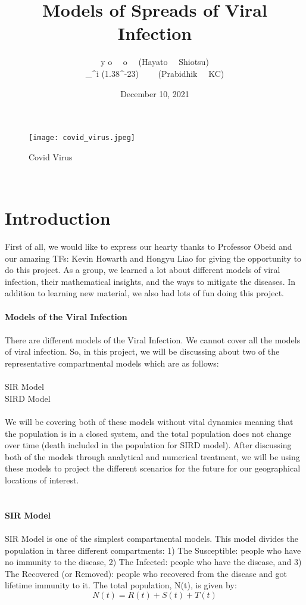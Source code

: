 \documentclass[11pt]{article}
\author{\Large  \hbar \alpha y \alpha \tau \omicron o  \ \ \Xi o \tau \sigma \upsilon \ \ (Hayato \ \ Shiotsu)\\
\Large \int\limits_\gamma^\alpha \beta \sqrt{-1}\partial \hbar i (1.38\times 10^{-23})\ \ \frac{R}{N_A}\frac{1}{\sqrt{\mu_0 \epsilon_0}} \ \ (Prabidhik \ \ KC)}
\date{\LARGE December 10, 2021}
\title{\Huge \textbf{Models of Spreads of Viral Infection}}
\theoremstyle{definition}
\begin{document}
\maketitle

\begin{figure}[htp]
\centering
    \texttt{[image: covid\_virus.jpeg]}
    \caption{Covid Virus}
\end{figure}\\




\section{Introduction}
First of all, we would like to express our hearty thanks to Professor Obeid and our amazing TFs: Kevin Howarth and Hongyu Liao for giving the opportunity to do this project. As a group, we learned a lot about different models of viral infection, their mathematical insights, and the ways to mitigate the diseases. In addition to learning new material, we also had lots of fun doing this project.\\
\\

{\Large\textbf{Models of the Viral Infection }}\\
\\
There are different models of the Viral Infection. We cannot cover all the models of viral infection. So, in this project, we will be discussing about two of the representative compartmental models which are as follows:\\
\\
SIR Model \\
SIRD Model \\
\\
We will be covering both of these models without vital dynamics meaning that the population is in a closed system, and the total population does not change over time (death included in the population for SIRD model). After discussing both of the models through analytical and numerical treatment, we will be using these models to project the different scenarios for the future for our geographical locations of interest.\\
\\
\\
\textbf{\Large SIR Model}\\
\\
SIR Model is one of the simplest compartmental models. This model divides the population in three different compartments: 1) The Susceptible: people who have no immunity to the disease, 2) The Infected: people who have the disease, and 3) The Recovered (or Removed): people who recovered from the disease and got lifetime immunity to it. The total population, N(t), is given by:
$$N(t) = R(t) + S(t) + T(t)$$
\end{document}
